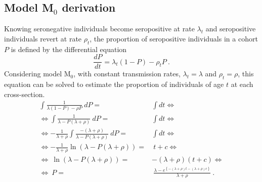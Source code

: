 \begin{appendices}
\pagestyle{plain}
\newpage
{}
\renewcommand{\thesubsection}{\Alph{subsection}}

\subsection{Model M$_0$ derivation} \label{appendix:M0.derivation}

Knowing seronegative individuals become seropositive at rate $\lambda_t$ and seropositive individuals revert at rate $\rho_t$, the proportion of seropositive individuals in a cohort $P$ is defined by the differential equation \cite{yman2016antibody}
%
\begin{equation}
    \frac{dP}{dt}=\lambda_t (1-P) - \rho_t P\ .
\end{equation}
%
\noindent
Considering model M$_0$, with constant transmission rates, $\lambda_t=\lambda$ and $\rho_t=\rho$, this equation can be solved to estimate the proportion of individuals of age $t$ at each cross-section.
%
\begin{equation}
\label{eq:apendix.2}
\begin{split}
    \int \frac{1}{\lambda(1-P)-\rho P}\ dP =& \int dt \Leftrightarrow \\
    \Leftrightarrow \int \frac{1}{\lambda-P(\lambda+\rho)}\ dP =&  \int dt \Leftrightarrow \\
    \Leftrightarrow -\frac{1}{\lambda+\rho} \int \frac{-(\lambda+\rho)}{\lambda-P(\lambda+\rho)}\ dP =&  \int dt \Leftrightarrow \\
    \Leftrightarrow -\frac{1}{\lambda+\rho} \ln(\lambda-P(\lambda+\rho)) =&\  t+c \Leftrightarrow \\
    \Leftrightarrow \  \ln(\lambda-P(\lambda+\rho)) =& -(\lambda+\rho)(t+c) \Leftrightarrow \\
    \Leftrightarrow \  P =&\  \frac{\lambda - e^{ \left\{ -(\lambda+\rho)t-(\lambda+\rho)c\right\}}}{\lambda+\rho}\ .
\end{split}
\end{equation}


\end{appendices}
